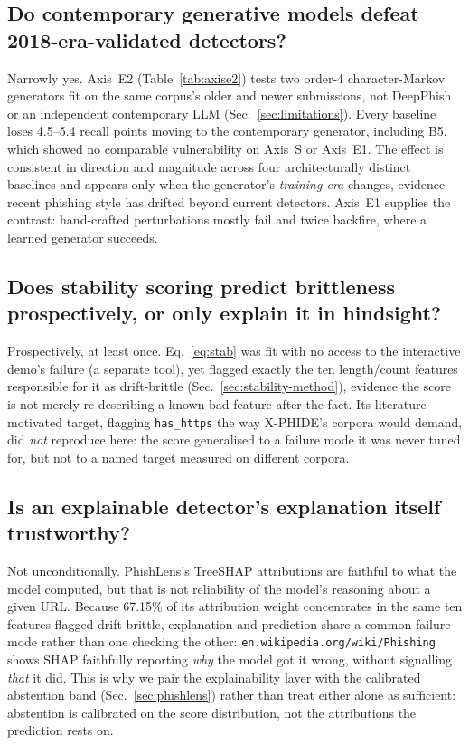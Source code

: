\documentclass[conference]{IEEEtran}
\begin{document}
\subsection{Do contemporary generative models defeat 2018-era-validated detectors?}

Narrowly yes. Axis~E2 (Table~\ref{tab:axise2}) tests two order-4
character-Markov generators fit on the same corpus's older and newer
submissions, not DeepPhish or an independent contemporary LLM
(Sec.~\ref{sec:limitations}). Every baseline loses 4.5--5.4 recall points
moving to the contemporary generator, including B5, which showed no comparable vulnerability on Axis~S or Axis~E1. The effect is consistent
in direction and magnitude across four architecturally distinct baselines
and appears only when the generator's \emph{training era} changes,
evidence recent phishing style has drifted beyond current detectors. Axis~E1 supplies the
contrast: hand-crafted perturbations mostly fail and twice backfire,
where a learned generator succeeds.

\subsection{Does stability scoring predict brittleness prospectively, or only explain it in hindsight?}

Prospectively, at least once. Eq.~\eqref{eq:stab} was fit with no access
to the interactive demo's failure (a separate tool), yet flagged exactly
the ten length/count features responsible for it as drift-brittle (Sec.~\ref{sec:stability-method}), evidence the score is
not merely re-describing a known-bad feature after the fact. Its
literature-motivated target, flagging \texttt{has\_https} the way
X-PHIDE's corpora would demand, did \emph{not} reproduce here: the score
generalised to a failure mode it was never tuned for, but not to a named
target measured on different corpora.

\subsection{Is an explainable detector's explanation itself trustworthy?}

Not unconditionally. PhishLens's TreeSHAP attributions are faithful to
what the model computed, but that is not reliability of the model's
reasoning about a given URL. Because 67.15\% of its attribution weight
concentrates in the same ten features flagged drift-brittle, explanation
and prediction share a common failure mode rather than one checking the
other: \texttt{en.wikipedia.org/wiki/Phishing} shows SHAP faithfully
reporting \emph{why} the model got it wrong, without signalling
\emph{that} it did. This is why we pair the explainability layer with the
calibrated abstention band (Sec.~\ref{sec:phishlens}) rather than treat
either alone as sufficient: abstention is calibrated on the score
distribution, not the attributions the prediction rests on.
\end{document}
